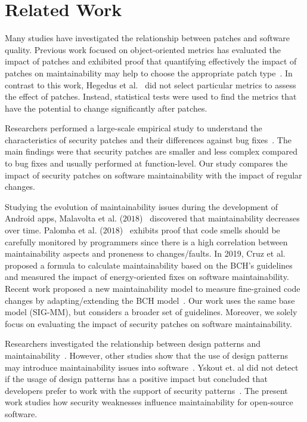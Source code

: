 \documentclass[smallextended]{svjour3}       %
\begin{document}
\section{Related Work}\label{sec:rw}

Many studies have investigated the relationship between patches and
software quality. Previous work focused on object-oriented metrics has evaluated the
impact of patches and exhibited proof that quantifying effectively the
impact of patches on maintainability may help to choose the appropriate
patch type~\cite{1167822}. In contrast to this work, Hegedus et
al.~\cite{HEGEDUS2018313} did not select particular metrics to assess the effect
of patches. Instead, statistical tests were used to find the metrics that
have the potential to change significantly after patches. 

Researchers
performed a large-scale empirical study to understand the characteristics of security patches
and their differences against bug fixes~\cite{10.1145/3133956.3134072}.
The main findings were that security patches are smaller and less complex compared
to bug fixes and usually performed at function-level. Our study compares
the impact of security patches on software maintainability with the impact 
of regular changes.

Studying the evolution 
of maintainability issues during the development of Android apps, Malavolta et al. ($2018$)~\cite{8530041}
discovered that maintainability decreases over time. Palomba et al.
($2018$)~\cite{Palomba:2018:DIM:3231288.3231337} exhibits proof that code smells
should be carefully monitored by programmers since there is a high correlation
between maintainability aspects and proneness to changes/faults. In 2019, Cruz et 
al.~\cite{8919169} proposed a formula to calculate maintainability 
based on the BCH's guidelines and measured the impact of energy-oriented fixes 
on software maintainability. Recent work
proposed a new maintainability model to 
measure fine-grained code changes by adapting/extending the BCH model~\cite{8785997}.
Our work uses the same base model (SIG-MM), but considers a broader set of guidelines. 
Moreover, we solely focus on evaluating the impact of security patches on software maintainability.

Researchers investigated the relationship between design patterns and
maintainability~\cite{10.1007/978-3-642-35267-6-18}. However, other studies show that 
the use of design patterns may introduce maintainability issues into
software~\cite{4493325}. Yskout et. al did not detect if the usage of 
design patterns has a positive impact but concluded that developers prefer to 
work with the support of security patterns~\cite{8077802}. The present work 
studies how security weaknesses influence maintainability for open-source software.
\end{document}
